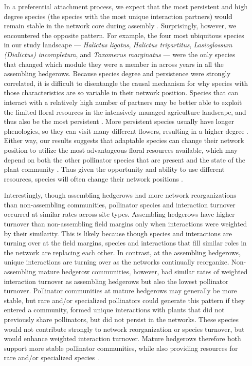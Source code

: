 \documentclass[12pt]{article}
\begin{document}
In a preferential attachment process, we expect that the most
persistent and high degree species (the species with the most unique
interaction partners) would remain stable in the network core during
assembly \citep{barabasi1999emergence}. Surprisingly, however, we
encountered the opposite pattern. For example, the four most
ubiquitous species in our study landscape --- \textit{Halictus
  ligatus}, \textit{Halictus tripartitus}, \textit{Lasioglossum
  (Dialictus) incompletum}, and \textit{Toxomerus marginatus} --- were
the only species that changed which module they were a member in
across years in all the assembling hedgerows. Because species degree
and persistence were strongly correlated, it is difficult to
disentangle the causal mechanism for why species with those
characteristics are so variable in their network position. Species
that can interact with a relatively high number of partners may be
better able to exploit the limited floral resources in the intensively
managed agriculture landscape, and thus also be the most persistent
\citep[in ant-plant mutualisms, ][]{diaz2010changes}. More persistent
species usually have longer phenologies, so they can visit many
different flowers, resulting in a higher degree \citep{Vazquez2009,
  fort2016abundance}. Either way, our results suggests that adaptable
species can change their network position to utilize the most
advantageous floral resources available, which may depend on both the
other pollinator species that are present and the state of the plant
community \citep{Waser1996, gomez2006ecological,
  macleod2016measuring}. Thus given the opportunity and ability to use
different resources, species will often change their network positions
\citep{macleod2016measuring}.

Interestingly, though assembling hedgerows had more network
reorganizations than non-assembling communities, pollinator species
and interaction turnover occurred at similar rates across site types.
Assembling hedgerows have higher turnover than non-assembling field
margins only when interactions were weighted by their similarity. This
is likely because though species and interactions are turning over at
the field margins, species and interactions that fill similar roles in
the network are replacing each other. In contrast, at the assembling
hedgerows, unique interactions are turning over as the networks
continually reorganize. Non-assembling mature hedgerow communities,
however, had similar rates of weighted interaction turnover as
assembling hedgerows but also the lowest pollinator
turnover. Pollinator communities at mature hedgerows may generally be
more stable, but rare and/or specialized pollinators could generate
this pattern if they entered a community, formed unique interactions
with plants that did not previously share pollinators, but did not
persist in the networks. These species would not contribute strongly
to network reorganization or species turnover, but would enhance
weighted interaction turnover. Mature hedgerows therefore both support
more stable pollinator communities, while also providing resources for
rare and/or specialized species \citep{kremen-2015-602,
  mgonigle-2015-x}.
\end{document}
